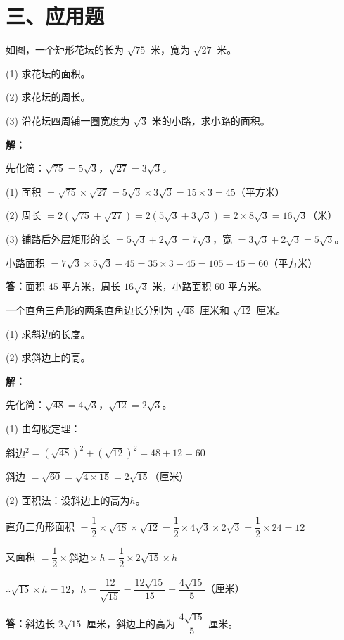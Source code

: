 \documentclass[12pt, a4paper]{ctexart}
\begin{document}
\section*{\textcolor{apppurple}{三、应用题}}

\begin{appbox}[【应用1】面积与根式计算]
如图，一个矩形花坛的长为 $\sqrt{75}$ 米，宽为 $\sqrt{27}$ 米。

(1) 求花坛的面积。

(2) 求花坛的周长。

(3) 沿花坛四周铺一圈宽度为 $\sqrt{3}$ 米的小路，求小路的面积。

\bigskip
\textbf{解：}

先化简：$\sqrt{75} = 5\sqrt{3}$，$\sqrt{27} = 3\sqrt{3}$。

(1) 面积 $= \sqrt{75} \times \sqrt{27} = 5\sqrt{3} \times 3\sqrt{3} = 15 \times 3 = 45$（平方米）

(2) 周长 $= 2(\sqrt{75} + \sqrt{27}) = 2(5\sqrt{3} + 3\sqrt{3}) = 2 \times 8\sqrt{3} = 16\sqrt{3}$（米）

(3) 铺路后外层矩形的长 $= 5\sqrt{3} + 2\sqrt{3} = 7\sqrt{3}$，宽 $= 3\sqrt{3} + 2\sqrt{3} = 5\sqrt{3}$。

小路面积 $= 7\sqrt{3} \times 5\sqrt{3} - 45 = 35 \times 3 - 45 = 105 - 45 = 60$（平方米）

\textbf{答：}面积 $45$ 平方米，周长 $16\sqrt{3}$ 米，小路面积 $60$ 平方米。
\end{appbox}

\begin{appbox}[【应用2】勾股定理与二次根式]
一个直角三角形的两条直角边长分别为 $\sqrt{48}$ 厘米和 $\sqrt{12}$ 厘米。

(1) 求斜边的长度。

(2) 求斜边上的高。

\bigskip
\textbf{解：}

先化简：$\sqrt{48} = 4\sqrt{3}$，$\sqrt{12} = 2\sqrt{3}$。

(1) 由勾股定理：

斜边$^2 = (\sqrt{48})^2 + (\sqrt{12})^2 = 48 + 12 = 60$

斜边 $= \sqrt{60} = \sqrt{4 \times 15} = 2\sqrt{15}$（厘米）

(2) 面积法：设斜边上的高为$h$。

直角三角形面积 $= \dfrac{1}{2} \times \sqrt{48} \times \sqrt{12} = \dfrac{1}{2} \times 4\sqrt{3} \times 2\sqrt{3} = \dfrac{1}{2} \times 24 = 12$

又面积 $= \dfrac{1}{2} \times 斜边 \times h = \dfrac{1}{2} \times 2\sqrt{15} \times h$

$\therefore \sqrt{15} \times h = 12$，$h = \dfrac{12}{\sqrt{15}} = \dfrac{12\sqrt{15}}{15} = \dfrac{4\sqrt{15}}{5}$（厘米）

\textbf{答：}斜边长 $2\sqrt{15}$ 厘米，斜边上的高为 $\dfrac{4\sqrt{15}}{5}$ 厘米。
\end{appbox}
\end{document}
